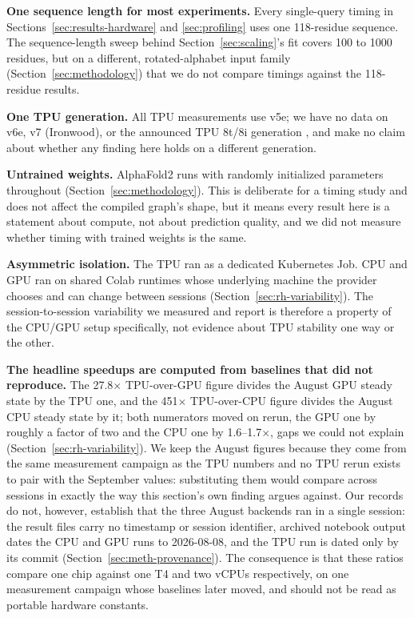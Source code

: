 
\textbf{One sequence length for most experiments.} Every single-query
timing in Sections~\ref{sec:results-hardware} and
\ref{sec:profiling} uses one 118-residue sequence. The
sequence-length sweep behind Section~\ref{sec:scaling}'s fit covers
100 to 1000 residues, but on a different, rotated-alphabet input
family (Section~\ref{sec:methodology}) that we do not compare
timings against the 118-residue results.

\textbf{One TPU generation.} All TPU measurements use v5e; we have no
data on v6e, v7 (Ironwood), or the announced TPU 8t/8i generation
\citep{googletpuv8ann2026}, and make no claim about whether any
finding here holds on a different generation.

\textbf{Untrained weights.} AlphaFold2 runs with randomly initialized
parameters throughout (Section~\ref{sec:methodology}). This is
deliberate for a timing study and does not affect the compiled
graph's shape, but it means every result here is a statement about
compute, not about prediction quality, and we did not measure whether
timing with trained weights is the same.

\textbf{Asymmetric isolation.} The TPU ran as a dedicated Kubernetes
Job. CPU and GPU ran on shared Colab runtimes whose underlying
machine the provider chooses and can change between sessions
(Section~\ref{sec:rh-variability}). The session-to-session
variability we measured and report is therefore a property of the
CPU/GPU setup specifically, not evidence about TPU stability one way
or the other.

\textbf{The headline speedups are computed from baselines that did not
reproduce.} The 27.8$\times$ TPU-over-GPU figure divides the August GPU
steady state by the TPU one, and the 451$\times$ TPU-over-CPU figure
divides the August CPU steady state by it; both numerators moved on
rerun, the GPU one by roughly a factor of two and the CPU one by
1.6--1.7$\times$, gaps we could not explain
(Section~\ref{sec:rh-variability}). We keep the August figures because
they come from the same measurement campaign as the TPU numbers and no
TPU rerun exists to pair with the September values: substituting them
would compare across sessions in exactly the way this section's own
finding argues against. Our records do not, however, establish that the
three August backends ran in a single session: the result files carry
no timestamp or session identifier, archived notebook output dates the
CPU and GPU runs to 2026-08-08, and the TPU run is dated only by its
commit (Section~\ref{sec:meth-provenance}).
The consequence is that these ratios compare one chip against one T4
and two vCPUs respectively, on one measurement campaign whose baselines
later moved, and should not be read as portable hardware constants.

